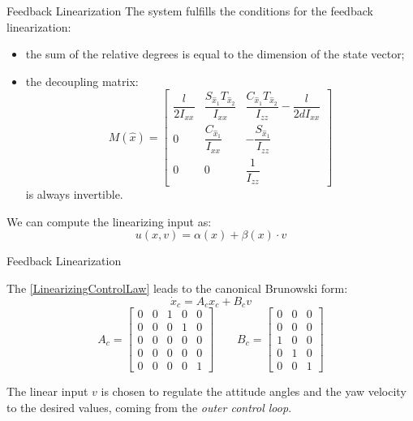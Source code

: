 \begin{frame}{Feedback Linearization}
	The system fulfills the conditions for the feedback linearization:
	\begin{itemize}
		\item the sum of the relative degrees is equal to the dimension of the state vector;
		\item the decoupling matrix:
			\begin{equation}
		{M(\hat{x})} = 
		\begin{bmatrix}
		\dfrac{l}{2I_{xx}} & \dfrac{S_{\hat{x}_1} T_{\hat{x}_2}}{I_{xx}} & \dfrac{C_{\hat{x}_1}T_{\hat{x}_2}}{I_{zz}} -\dfrac{l}{2dI_{xx}} \\
		0 & \dfrac{C_{\hat{x}_1}}{I_{xx}} & -\dfrac{S_{\hat{x}_1}}{I_{zz}} \\
		0 & 0 & \dfrac{1}{I_{zz}} 
		\end{bmatrix}
		\end{equation}
		is always invertible.
	\end{itemize}
\pause
	We can compute the linearizing input as:
	\begin{equation}
	{u(x,v) = \alpha(x)+\beta(x)\cdot v}
	\label{LinearizingControlLaw}
\end{equation}
\end{frame}

\begin{frame}{Feedback Linearization}

	The \eqref{LinearizingControlLaw} leads to the canonical Brunowski form:
	\begin{equation}
	{\dot{x}_c = A_c x_c + B_c v}
	\end{equation}
	\renewcommand{\arraystretch}{1}
	\begin{equation}
	{A_c} = 
	\begin{bmatrix}
	0 & 0 & 1 & 0 & 0 \\
	0 & 0 & 0 & 1 & 0 \\
	0 & 0 & 0 & 0 & 0 \\
	0 & 0 & 0 & 0 & 0 \\
	0 & 0 & 0 & 0 & 1	
	\end{bmatrix} \qquad
	{B_c} = 
	\begin{bmatrix}
	0 & 0 & 0 \\
	0 & 0 & 0 \\
	1 & 0 & 0 \\
	0 & 1 & 0 \\
	0 & 0 & 1
	\end{bmatrix}
	\end{equation}
	
	The linear input $ v $ is chosen to regulate the attitude angles and the yaw velocity to the desired values, coming from the \textit{outer control loop}.
	
\end{frame}